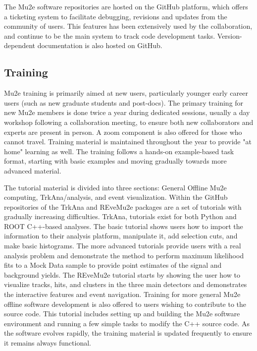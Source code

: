 The Mu2e software repositories are hosted on the GitHub platform, which offers a ticketing system to facilitate debugging, revisions and updates from the community of users. This features has been extensively used by the collaboration, and continue to be the main system to track code development tasks. Version-dependent documentation is also hosted on GitHub.




\subsection{Training}

Mu2e training is primarily aimed at new users, particularly younger early career users (such as new graduate students and post-docs). The primary training for new Mu2e members is done twice a year during dedicated sessions, usually a day workshop following a collaboration meeting, to ensure both new collaborators and experts are present in person. A zoom component is also offered for those who cannot travel. Training material is maintained throughout the year to provide "at home" learning as well. The training follows a hands-on example-based task format, starting with basic examples and moving gradually towards more advanced material. 

The tutorial material is divided into three sections: General Offline Mu2e computing, TrkAna/analysis, and event visualization. Within the GitHub repositories of the TrkAna and REveMu2e packages are a set of tutorials with gradually increasing difficulties. TrkAna, tutorials exist for both Python and ROOT C++-based analyses. The basic tutorial shows users how to import the information to their analysis platform, manipulate it, add selection cuts, and make basic histograms. The more advanced tutorials provide users with a real analysis problem and demonstrate the method to perform maximum likelihood fits to a Mock Data sample to provide point estimates of the signal and background yields. The REveMu2e tutorial starts by showing the user how to visualize tracks, hits, and clusters in the three main detectors and demonstrates the interactive features and event navigation. Training for more general Mu2e offline software development is also offered to users wishing to contribute to the source code. This tutorial includes setting up and building the Mu2e software environment and running a few simple tasks to modify the C++ source code. As the software evolves rapidly, the training material is updated frequently to ensure it remains always functional.